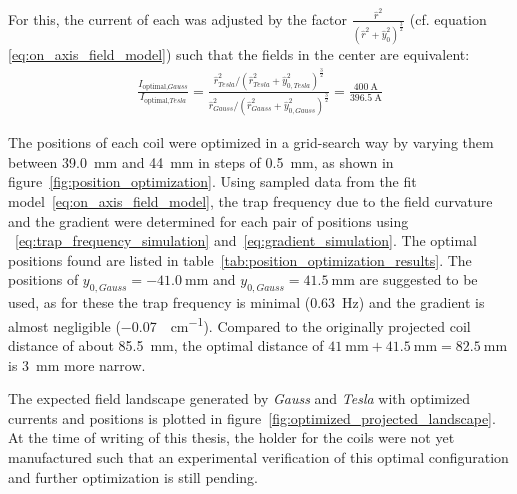 For this, the current of each was adjusted by the factor $\frac{\hat r^2}{(\hat r^2 + \hat y_0^2)^\frac{3}{2}}$ (cf. equation \eqref{eq:on_axis_field_model}) such that the fields in the center are equivalent:
\begin{align}
    \frac{I_{\text{optimal}, \textit{Gauss}}}{I_{\text{optimal}, \textit{Tesla}}} = \frac{\hat r_\textit{Tesla}^2 / (\hat r_\textit{Tesla}^2 + \hat y_{0, \textit{Tesla}}^2)^\frac{3}{2}}{\hat r_\textit{Gauss}^2 / (\hat r_\textit{Gauss}^2 + \hat y_{0, \textit{Gauss}}^2)^\frac{3}{2}} = \frac{\SI{400}{\ampere}}{\SI{396.5}{\ampere}}
\end{align}

The positions of each coil were optimized in a grid-search way by varying them between \SI{39.0}{\milli\meter} and \SI{44}{\milli\meter} in steps of \SI{0.5}{\milli\meter}, as shown in figure~\ref{fig:position_optimization}. Using sampled data from the fit model~\eqref{eq:on_axis_field_model}, the trap frequency due to the field curvature and the gradient were determined for each pair of positions using ~\eqref{eq:trap_frequency_simulation} and~\eqref{eq:gradient_simulation}.
The optimal positions found are listed in table~\ref{tab:position_optimization_results}. The positions of $y_{0, \textit{Gauss}} = \SI{-41.0}{\milli\meter}$ and $y_{0, \textit{Gauss}} = \SI{41.5}{\milli\meter}$ are suggested to be used, as for these the trap frequency is minimal (\SI{0.63}{\hertz}) and the gradient is almost negligible (\SI{-0.07}{\gauss\per\centi\meter}). Compared to the originally projected coil distance of about \SI{85.5}{\milli\meter}, the optimal distance of $\SI{41}{\milli\meter} + \SI{41.5}{\milli\meter} = \SI{82.5}{\milli\meter}$ is \SI{3}{\milli\meter} more narrow.

The expected field landscape generated by \textit{Gauss} and \textit{Tesla} with optimized currents and positions is plotted in figure~\ref{fig:optimized_projected_landscape}. At the time of writing of this thesis, the holder for the coils were not yet manufactured such that an experimental verification of this optimal configuration and further optimization is still pending.


